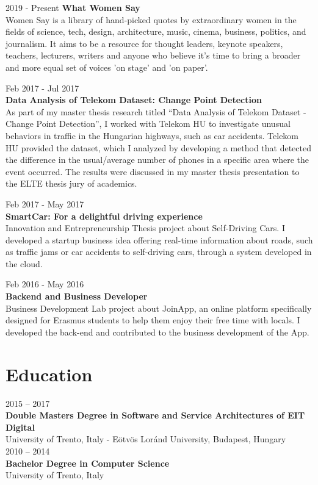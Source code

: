 \documentclass[]{friggeri-cv}
\begin{document}
{2019 - Present}
{\textbf{What Women Say}} \\
Women Say is a library of hand-picked quotes by extraordinary women in the fields of science, tech, design, architecture, music, cinema, business, politics, and journalism. It aims to be a resource for thought leaders, keynote speakers, teachers, lecturers, writers and anyone who believe it’s time to bring a broader and more equal set of voices 'on stage' and 'on paper'.

{Feb 2017 - Jul 2017} \\
{\textbf{Data Analysis of Telekom Dataset: Change Point Detection}} \\
As part of my master thesis research titled “Data Analysis of Telekom Dataset - Change Point Detection”, I worked with Telekom HU to investigate unusual behaviors in traffic in the Hungarian highways, such as car accidents. Telekom HU provided the dataset, which I analyzed by developing a method that detected the difference in the usual/average number of phones in a specific area where the event occurred. The results were discussed in my master thesis presentation to the ELTE thesis jury of academics.

{Feb 2017 - May 2017} \\
{\textbf{SmartCar: For a delightful driving experience}} \\
Innovation and Entrepreneurship Thesis project about Self-Driving Cars. I developed a startup business idea offering real-time information about roads, such as traffic jams or car accidents to self-driving cars, through a system developed in the cloud.

{Feb 2016 - May 2016} \\
{\textbf{Backend and Business Developer}} \\
Business Development Lab project about JoinApp, an online platform specifically designed for Erasmus students to help them enjoy their free time with locals. I developed the back-end and contributed to the business development of the App. \newline


\section{Education}

{2015 -- 2017} \\
\textbf{Double Masters Degree {\normalfont in Software and Service Architectures of EIT Digital}} \\
{University of Trento, Italy - Eötvös Loránd University, Budapest, Hungary} \\

{2010 -- 2014} \\
\textbf{Bachelor Degree {\normalfont in Computer Science}} \\
{University of Trento, Italy}
\end{document}
